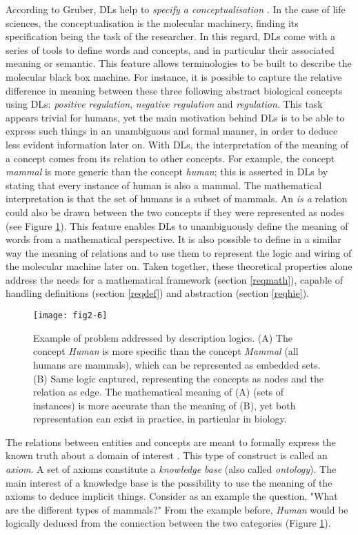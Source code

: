 According to Gruber, DLs help to \emph{specify a conceptualisation} \citep{gruber2009encyclopedia}. In the case of life sciences, the conceptualisation is the molecular machinery, finding its specification being the task of the researcher. In this regard, DLs come with a series of tools to define words and concepts, and in particular their associated meaning or semantic. This feature allows terminologies to be built to describe the molecular black box machine. For instance, it is possible to capture the relative difference in meaning between these three following abstract biological concepts using DLs: \emph{positive regulation}, \emph{negative regulation} and \emph{regulation}. This task appears trivial for humans, yet the main motivation behind DLs is to be able to express such things in an unambiguous and formal manner, in order to deduce less evident information later on. With DLs, the interpretation of the meaning of a concept comes from its relation to other concepts. For example, the concept \emph{mammal} is more generic than the concept \emph{human}; this is asserted in DLs by stating that every instance of human is also a mammal. The mathematical interpretation is that the set of humans is a subset of mammals. An \emph{is a} relation could also be drawn between the two concepts if they were represented as nodes (see Figure \ref{fig2-6}). This feature enables DLs to unambiguously define the meaning of words from a mathematical perspective. It is also possible to define in a similar way the meaning of relations and to use them to represent the logic and wiring of the molecular machine later on. Taken together, these theoretical properties alone address the needs for a mathematical framework (section \ref{reqmath}), capable of handling definitions (section \ref{reqdef}) and abstraction (section \ref{reqhie}).

\begin{figure}[ht]
    \centering
    \texttt{[image: fig2-6]}
    \caption{Example of problem addressed by description logics. (A) The concept \emph{Human} is more specific than the concept \emph{Mammal} (all humans are mammals), which can be represented as embedded sets. (B) Same logic captured, representing the concepts as nodes and the relation as edge. The mathematical meaning of (A) (sets of instances) is more accurate than the meaning of (B), yet both representation can exist in practice, in particular in biology.}
    \label{fig2-6}
\end{figure}

The relations between entities and concepts are meant to formally express the known truth about a domain of interest \cite{stevens2007using} \cite{krotzsch2012owl} \citep{hitzler2009owl}. This type of construct is called an \emph{axiom}. A set of axioms constitute a \emph{knowledge base} (also called \emph{ontology}). The main interest of a knowledge base is the possibility to use the meaning of the axioms to deduce implicit things. Consider as an example the question, "What are the different types of mammals?" From the example before, \emph{Human} would be logically deduced from the connection between the two categories (Figure \ref{fig2-6}).

